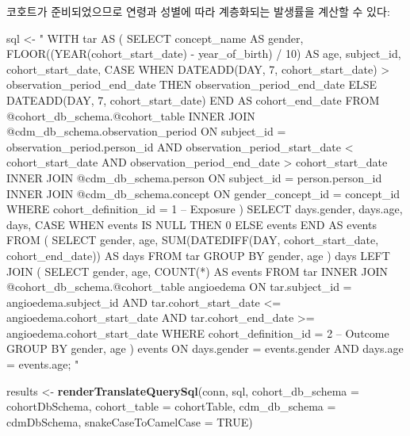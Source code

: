\documentclass[10.5pt]{book}
\newenvironment{Shaded}{\begin{snugshade}}{\end{snugshade}}
\newcommand{\KeywordTok}[1]{\textcolor[rgb]{0.13,0.29,0.53}{\textbf{#1}}}
\newcommand{\DataTypeTok}[1]{\textcolor[rgb]{0.13,0.29,0.53}{#1}}
\newcommand{\StringTok}[1]{\textcolor[rgb]{0.31,0.60,0.02}{#1}}
\newcommand{\OtherTok}[1]{\textcolor[rgb]{0.56,0.35,0.01}{#1}}
\newcommand{\NormalTok}[1]{#1}
\theoremstyle{definition}
\theoremstyle{definition}
\theoremstyle{definition}
\theoremstyle{remark}
\begin{document}
코호트가 준비되었으므로 연령과 성별에 따라 계층화되는 발생률을 계산할 수
있다:

\begin{Shaded}
\begin{Highlighting}[]
\NormalTok{sql <-}\StringTok{ "}
\StringTok{WITH tar AS (}
\StringTok{  SELECT concept_name AS gender,}
\StringTok{    FLOOR((YEAR(cohort_start_date) -}
\StringTok{          year_of_birth) / 10) AS age,}
\StringTok{    subject_id,}
\StringTok{    cohort_start_date,}
\StringTok{    CASE WHEN DATEADD(DAY, 7, cohort_start_date) >}
\StringTok{      observation_period_end_date}
\StringTok{    THEN observation_period_end_date}
\StringTok{    ELSE DATEADD(DAY, 7, cohort_start_date)}
\StringTok{    END AS cohort_end_date}
\StringTok{  FROM @cohort_db_schema.@cohort_table}
\StringTok{  INNER JOIN @cdm_db_schema.observation_period}
\StringTok{    ON subject_id = observation_period.person_id}
\StringTok{      AND observation_period_start_date < cohort_start_date}
\StringTok{      AND observation_period_end_date > cohort_start_date}
\StringTok{  INNER JOIN @cdm_db_schema.person}
\StringTok{    ON subject_id = person.person_id}
\StringTok{  INNER JOIN @cdm_db_schema.concept}
\StringTok{    ON gender_concept_id = concept_id}
\StringTok{  WHERE cohort_definition_id = 1 -- Exposure}
\StringTok{)}
\StringTok{SELECT days.gender,}
\StringTok{    days.age,}
\StringTok{    days,}
\StringTok{    CASE WHEN events IS NULL THEN 0 ELSE events END AS events}
\StringTok{FROM (}
\StringTok{  SELECT gender,}
\StringTok{    age,}
\StringTok{    SUM(DATEDIFF(DAY, cohort_start_date,}
\StringTok{      cohort_end_date)) AS days}
\StringTok{  FROM tar}
\StringTok{  GROUP BY gender,}
\StringTok{    age}
\StringTok{) days}
\StringTok{LEFT JOIN (}
\StringTok{  SELECT gender,}
\StringTok{      age,}
\StringTok{      COUNT(*) AS events}
\StringTok{  FROM tar}
\StringTok{  INNER JOIN @cohort_db_schema.@cohort_table angioedema}
\StringTok{    ON tar.subject_id = angioedema.subject_id}
\StringTok{      AND tar.cohort_start_date <= angioedema.cohort_start_date}
\StringTok{      AND tar.cohort_end_date >= angioedema.cohort_start_date}
\StringTok{  WHERE cohort_definition_id = 2 -- Outcome}
\StringTok{  GROUP BY gender,}
\StringTok{    age}
\StringTok{) events}
\StringTok{ON days.gender = events.gender}
\StringTok{  AND days.age = events.age;}
\StringTok{"}

\NormalTok{results <-}\StringTok{ }\KeywordTok{renderTranslateQuerySql}\NormalTok{(conn, sql,}
                                   \DataTypeTok{cohort_db_schema =}\NormalTok{ cohortDbSchema,}
                                   \DataTypeTok{cohort_table =}\NormalTok{ cohortTable,}
                                   \DataTypeTok{cdm_db_schema =}\NormalTok{ cdmDbSchema,}
                                   \DataTypeTok{snakeCaseToCamelCase =} \OtherTok{TRUE}\NormalTok{)}
\end{Highlighting}
\end{Shaded}
\end{document}
